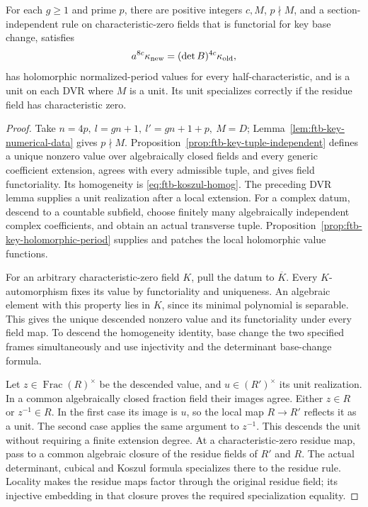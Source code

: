 \begin{srproposition}
\label{prop:ftb-key-away-rule}
For each \(g\geq1\) and prime \(p\), there are positive integers
\(c,M\), \(p\nmid M\), and a section-independent rule on
characteristic-zero fields that is functorial for key base change,
satisfies
\[
                 a^{8c}\kappa_{\rm new}
                          =(\det B)^{4c}\kappa_{\rm old},
\]
has holomorphic normalized-period values for every
half-characteristic, and is a unit on each DVR where \(M\) is a unit.
Its unit specializes correctly if the residue field has
characteristic zero.
\end{srproposition}
\begin{proof}
Take \(n=4p,\ l=gn+1,\ l'=gn+1+p,\ M=D\);
Lemma~\ref{lem:ftb-key-numerical-data} gives \(p\nmid M\).
Proposition~\ref{prop:ftb-key-tuple-independent} defines a unique
nonzero value over algebraically closed fields and every generic
coefficient extension, agrees with every admissible tuple, and
gives field functoriality.  Its homogeneity is
\eqref{eq:ftb-koszul-homog}.
The preceding DVR lemma supplies a unit realization after a
local extension.  For a complex datum, descend to a countable
subfield, choose finitely many algebraically independent complex
coefficients, and obtain an actual transverse tuple.
Proposition~\ref{prop:ftb-key-holomorphic-period} supplies and
patches the local holomorphic value functions.

For an arbitrary characteristic-zero field \(K\), pull the datum
to \(\overline K\).  Every \(K\)-automorphism fixes its value by
functoriality and uniqueness.  An algebraic element with this
property lies in \(K\), since its minimal polynomial is separable.
This gives the unique descended nonzero value and its functoriality
under every field map.  To descend the homogeneity identity,
base change the two specified frames simultaneously and use
injectivity and the determinant base-change formula.

Let \(z\in\operatorname{Frac}(R)^\times\) be the descended value,
and \(u\in(R')^\times\) its unit realization.  In a common
algebraically closed fraction field their images agree.
Either \(z\in R\) or \(z^{-1}\in R\).
In the first case its image is \(u\), so the local map \(R\to R'\)
reflects it as a unit.  The second case applies the same argument
to \(z^{-1}\).  This descends the unit without requiring a finite
extension degree.  At a characteristic-zero residue map, pass to
a common algebraic closure of the residue fields of \(R'\) and
\(R\).  The actual determinant, cubical and Koszul formula
specializes there to the residue rule.  Locality makes the
residue maps factor through the original residue field; its
injective embedding in that closure proves the required
specialization equality.
\end{proof}

